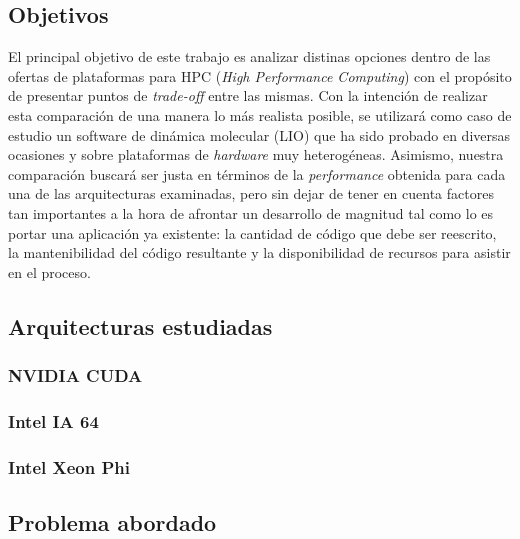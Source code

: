 \subsection{Objetivos}

El principal objetivo de este trabajo es analizar distinas opciones dentro de
las ofertas de plataformas para HPC (\textit{High Performance Computing}) con
el propósito de presentar puntos de \textit{trade-off} entre las mismas. Con la
intención de realizar esta comparación de una manera lo más realista posible,
se utilizará como caso de estudio un software de dinámica molecular (LIO) que
ha sido probado en diversas ocasiones y sobre plataformas de \textit{hardware}
muy heterogéneas. Asimismo, nuestra comparación buscará ser justa en términos
de la \textit{performance} obtenida para cada una de las arquitecturas
examinadas, pero sin dejar de tener en cuenta factores tan importantes a la
hora de afrontar un desarrollo de magnitud tal como lo es portar una
aplicación ya existente: la cantidad de código que debe ser reescrito, la
mantenibilidad del código resultante y la disponibilidad de recursos para
asistir en el proceso.

\subsection{Arquitecturas estudiadas}

\subsubsection{NVIDIA CUDA}

\subsubsection{Intel IA 64}

\subsubsection{Intel Xeon Phi}



\subsection{Problema abordado}


